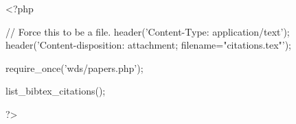 <?php

// Force this to be a file.
header('Content-Type: application/text');
header('Content-disposition: attachment; filename="citations.tex"');

require_once('wds/papers.php');

list_bibtex_citations();

?>
